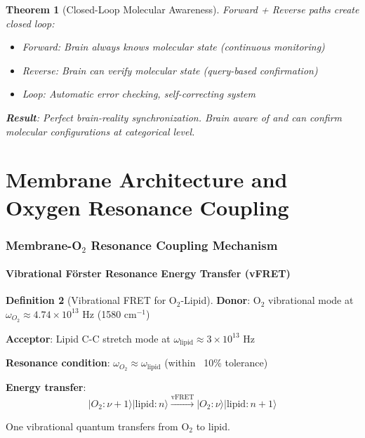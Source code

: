 \documentclass[11pt,a4paper]{article}
\newtheorem{theorem}{Theorem}[section]
\theoremstyle{definition}
\newtheorem{definition}[theorem]{Definition}
\theoremstyle{remark}
\begin{document}
\begin{theorem}[Closed-Loop Molecular Awareness]
Forward + Reverse paths create closed loop:
\begin{itemize}
\item Forward: Brain always knows molecular state (continuous monitoring)
\item Reverse: Brain can verify molecular state (query-based confirmation)
\item Loop: Automatic error checking, self-correcting system
\end{itemize}

\textbf{Result}: Perfect brain-reality synchronization. Brain aware of \textit{and can confirm} molecular configurations at categorical level.
\end{theorem}

\part{Membrane Architecture and Oxygen Resonance Coupling}

\section{Membrane-O$_2$ Resonance Coupling Mechanism}

\subsection{Vibrational Förster Resonance Energy Transfer (vFRET)}

\begin{definition}[Vibrational FRET for O$_2$-Lipid]
\textbf{Donor}: O$_2$ vibrational mode at $\omega_{O_2} \approx 4.74 \times 10^{13}$ Hz (1580 cm$^{-1}$)

\textbf{Acceptor}: Lipid C-C stretch mode at $\omega_{\text{lipid}} \approx 3 \times 10^{13}$ Hz

\textbf{Resonance condition}: $\omega_{O_2} \approx \omega_{\text{lipid}}$ (within ~10\% tolerance)

\textbf{Energy transfer}:
\begin{equation}
|O_2: \nu+1\rangle |\text{lipid}: n\rangle \xrightarrow{\text{vFRET}} |O_2: \nu\rangle |\text{lipid}: n+1\rangle
\end{equation}

One vibrational quantum transfers from O$_2$ to lipid.
\end{definition}
\end{document}

